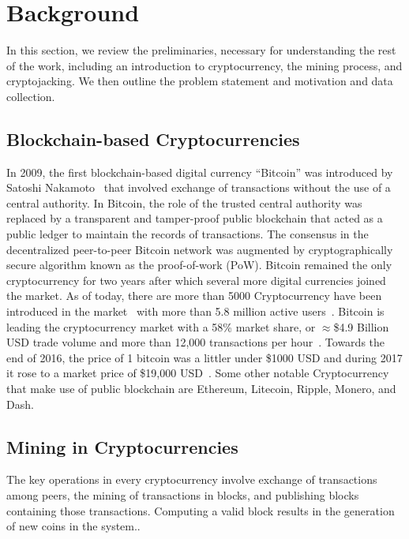 \documentclass[acmlarge]{acmart}
\newcommand{\cc}{{cryptocurrency}\xspace}
\newcommand{\Cc}{{Cryptocurrency}\xspace}
\newcommand{\cj}{cryptojacking\xspace}
\begin{document}
\section{Background}\label{sec:background}
In this section, we review the preliminaries, necessary for understanding the rest of the work, including an introduction to \cc, the mining process, and \cj. We then outline the problem statement and motivation and data collection. 



\subsection{Blockchain-based Cryptocurrencies}\label{sec:cryptos}
In 2009, the first blockchain-based digital currency ``Bitcoin'' was introduced by Satoshi Nakamoto~\cite{nakamoto2008bitcoin} that involved exchange of transactions without the use of a central authority. In Bitcoin, the role of the trusted central authority was replaced by a transparent and tamper-proof public blockchain that acted as a public ledger to maintain the records of transactions.  The consensus in the decentralized peer-to-peer Bitcoin network was augmented by cryptographically secure algorithm known as the proof-of-work (PoW). Bitcoin remained the only \cc for two years after which several more digital currencies joined the market. As of today, there are more than 5000 \Cc have been introduced in the market~\cite{atozforex} with more than 5.8 million active users~\cite{hileman2017global}. Bitcoin is leading the \cc market with a 58\% market share, or $\approx$\$4.9 Billion USD trade volume and more than 12,000 transactions per hour~\cite{bitcoinnews_2017}. 
Towards the end of 2016, the price of 1 bitcoin was a littler under \$1000 USD and during 2017 it rose to a market price of \$19,000 USD~\cite{blockexplorer}. Some other notable \Cc that make use of public blockchain are Ethereum, Litecoin, Ripple, Monero, and Dash. 

\subsection{Mining in Cryptocurrencies}\label{sec:mining}
The key operations in every \cc involve exchange of transactions among peers, the mining of transactions in blocks, and publishing blocks containing those transactions. Computing a valid block results in the generation of new coins in the system..
\end{document}

